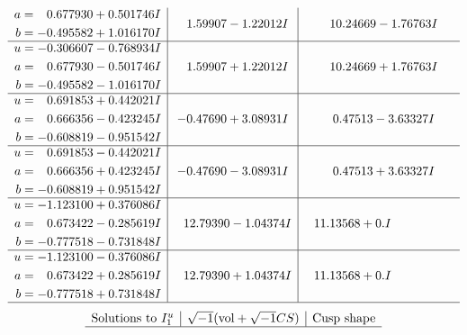 \documentclass[1p]{elsarticle_modified}
\theoremstyle{definition}
\newcommand{\I}{\sqrt{-1}}
\begin{document}
$$\begin{array}{c|c|c}
\begin{aligned}
a &= \phantom{-}0.677930 + 0.501746 I \\
b &= -0.495582 + 1.016170 I\end{aligned}
 & \phantom{-}1.59907 - 1.22012 I & \phantom{-}10.24669 - 1.76763 I \\ \hline\begin{aligned}
u &= -0.306607 - 0.768934 I \\
a &= \phantom{-}0.677930 - 0.501746 I \\
b &= -0.495582 - 1.016170 I\end{aligned}
 & \phantom{-}1.59907 + 1.22012 I & \phantom{-}10.24669 + 1.76763 I \\ \hline\begin{aligned}
u &= \phantom{-}0.691853 + 0.442021 I \\
a &= \phantom{-}0.666356 - 0.423245 I \\
b &= -0.608819 - 0.951542 I\end{aligned}
 & -0.47690 + 3.08931 I & \phantom{-}0.47513 - 3.63327 I \\ \hline\begin{aligned}
u &= \phantom{-}0.691853 - 0.442021 I \\
a &= \phantom{-}0.666356 + 0.423245 I \\
b &= -0.608819 + 0.951542 I\end{aligned}
 & -0.47690 - 3.08931 I & \phantom{-}0.47513 + 3.63327 I \\ \hline\begin{aligned}
u &= -1.123100 + 0.376086 I \\
a &= \phantom{-}0.673422 - 0.285619 I \\
b &= -0.777518 - 0.731848 I\end{aligned}
 & \phantom{-}12.79390 - 1.04374 I & \phantom{-}11.13568 + 0. I\phantom{ +0.000000I} \\ \hline\begin{aligned}
u &= -1.123100 - 0.376086 I \\
a &= \phantom{-}0.673422 + 0.285619 I \\
b &= -0.777518 + 0.731848 I\end{aligned}
 & \phantom{-}12.79390 + 1.04374 I & \phantom{-}11.13568 + 0. I\phantom{ +0.000000I}\\
 \hline 
 \end{array}$$\newpage$$\begin{array}{c|c|c}  
\text{Solutions to }I^u_{1}& \I (\text{vol} + \sqrt{-1}CS) & \text{Cusp shape}\\
 \hline 

\end{array}$$
\end{document}
